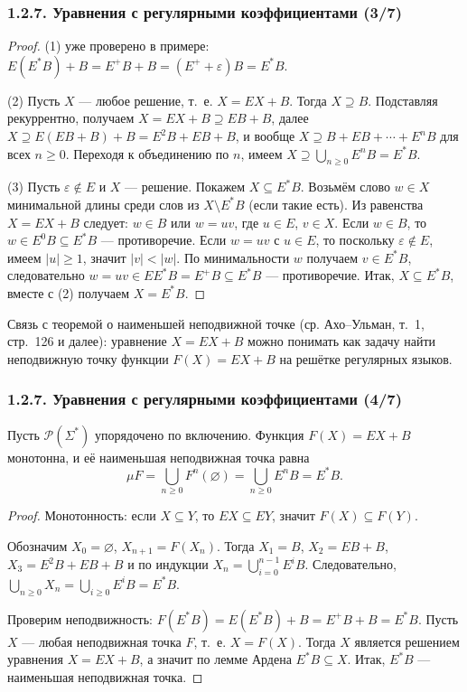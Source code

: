 \begin{frame}
\frametitle{1.2.7. Уравнения с регулярными коэффициентами (3/7)}


\begin{proof}
(1) уже проверено в примере: $E(E^*B)+B=E^+B+B=(E^++\varepsilon)B=E^*B$.

(2) Пусть $X$ --- любое решение, т.~е. $X=EX+B$.
Тогда $X\supseteq B$.
Подставляя рекуррентно, получаем
$X=EX+B\supseteq E B + B$,
далее $X\supseteq E(EB+B)+B=E^2B+EB+B$, и вообще
$X\supseteq B+EB+\cdots+E^nB$ для всех $n\ge 0$.
Переходя к объединению по $n$, имеем $X\supseteq \bigcup_{n\ge 0}E^nB=E^*B$.

(3) Пусть $\varepsilon\notin E$ и $X$ --- решение.
Покажем $X\subseteq E^*B$.
Возьмём слово $w\in X$ минимальной длины среди слов из $X\setminus E^*B$ (если такие есть).
Из равенства $X=EX+B$ следует: $w\in B$ или $w=uv$, где $u\in E$, $v\in X$.
Если $w\in B$, то $w\in E^0B\subseteq E^*B$ --- противоречие.
Если $w=uv$ с $u\in E$, то поскольку $\varepsilon\notin E$, имеем $|u|\ge 1$, значит $|v|<|w|$.
По минимальности $w$ получаем $v\in E^*B$, следовательно $w=uv\in EE^*B=E^+B\subseteq E^*B$ --- противоречие.
Итак, $X\subseteq E^*B$, вместе с (2) получаем $X=E^*B$.
\end{proof}

\begin{digress}
Связь с теоремой о наименьшей неподвижной точке (ср. Ахо--Ульман, т.~1, стр.~126 и далее):
уравнение $X=EX+B$ можно понимать как задачу найти неподвижную точку функции
$F(X)=EX+B$ на решётке регулярных языков.
\end{digress}
\end{frame}

\begin{frame}
\frametitle{1.2.7. Уравнения с регулярными коэффициентами (4/7)}


\begin{theorem}[Наименьшая неподвижная точка для $F(X)=EX+B$]
Пусть $\mathcal{P}(\Sigma^*)$ упорядочено по включению.
Функция $F(X)=EX+B$ монотонна, и её наименьшая неподвижная точка равна
\[
\mu F=\bigcup_{n\ge 0}F^n(\varnothing)=\bigcup_{n\ge 0}E^nB=E^*B.
\]
\end{theorem}

\begin{proof}
Монотонность: если $X\subseteq Y$, то $EX\subseteq EY$, значит $F(X)\subseteq F(Y)$.

Обозначим $X_0=\varnothing$, $X_{n+1}=F(X_n)$.
Тогда $X_1=B$, $X_2=EB+B$, $X_3=E^2B+EB+B$ и по индукции
$X_n=\bigcup_{i=0}^{n-1}E^iB$.
Следовательно, $\bigcup_{n\ge 0}X_n=\bigcup_{i\ge 0}E^iB=E^*B$.

Проверим неподвижность:
$F(E^*B)=E(E^*B)+B=E^+B+B=E^*B$.
Пусть $X$ --- любая неподвижная точка $F$, т.~е. $X=F(X)$.
Тогда $X$ является решением уравнения $X=EX+B$, а значит по лемме Ардена
$E^*B\subseteq X$.
Итак, $E^*B$ --- наименьшая неподвижная точка.
\end{proof}
\end{frame}

